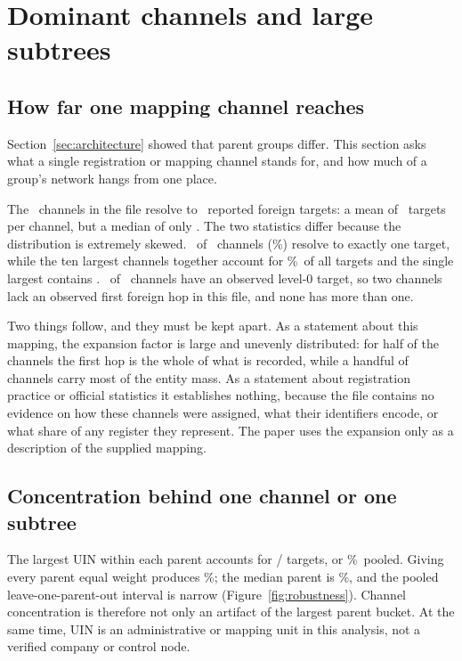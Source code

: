 \documentclass[11pt]{article}
\newcommand{\pct}{\%}
\newcommand{\FloatBarrier}{\clearpage}
\begin{document}
\FloatBarrier

\section{Dominant channels and large subtrees}
\label{sec:channels}

\subsection{How far one mapping channel reaches}

Section~\ref{sec:architecture} showed that parent groups differ. This section
asks what a single registration or mapping channel stands for, and how much of
a group's network hangs from one place.

The \UINs\ channels in the file resolve to \Targets\ reported foreign targets:
a mean of \TargetsPerUinMean\ targets per channel, but a median of only
\TargetsPerUinMedian. The two statistics differ because the distribution is
extremely skewed. \SingleTargetUins\ of \UINs\ channels
(\SingleTargetUinPct\pct) resolve to exactly one target, while the ten largest
channels together account for \TopTenUinPct\pct\ of all targets and the single
largest contains \LargestUinTargets. \ObservedRoots\ of \UINs\ channels have an
observed level-0 target, so two channels lack an observed first foreign hop in
this file, and none has more than one.

Two things follow, and they must be kept apart. As a statement about this
mapping, the expansion factor is large and unevenly distributed: for half of
the channels the first hop is the whole of what is recorded, while a handful of
channels carry most of the entity mass. As a statement about registration
practice or official statistics it establishes nothing, because the file
contains no evidence on how these channels were assigned, what their identifiers
encode, or what share of any register they represent. The paper uses the
expansion only as a description of the supplied mapping.

\subsection{Concentration behind one channel or one subtree}

The largest UIN within each parent accounts for \ModalUinCount/\Targets
targets, or \ModalUinPct\pct\ pooled. Giving every parent equal weight produces
\ModalUinEqualPct\pct; the median parent is \ModalUinMedianPct\pct, and the
pooled leave-one-parent-out interval is narrow (Figure~\ref{fig:robustness}).
Channel concentration is therefore not only an artifact of the largest parent
bucket. At the same time, UIN is an administrative or mapping unit in this
analysis, not a verified company or control node.
\end{document}
